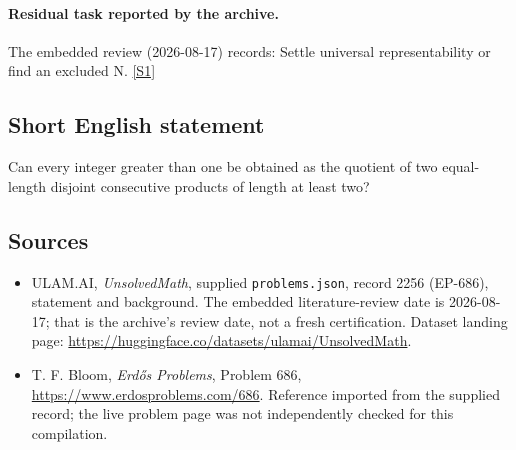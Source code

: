 \documentclass[11pt,a4paper]{article}
\newcommand{\sref}[2]{\hyperlink{source:#1:#2}{[S#2]}}
\begin{document}
\paragraph{Residual task reported by the archive.}

The embedded review (2026-08-17) records: Settle universal representability or find an excluded N. \sref{2256}{1}

\subsection{Short English statement}

Can every integer greater than one be obtained as the quotient of two equal-length disjoint consecutive products of length at least two?

\subsection{Sources}

{\small

\begin{itemize}

\item[\hypertarget{source:2256:1}{S1}] ULAM.AI, \emph{UnsolvedMath}, supplied \texttt{problems.json}, record 2256 (EP-686), statement and background. The embedded literature-review date is 2026-08-17; that is the archive’s review date, not a fresh certification. Dataset landing page: \url{https://huggingface.co/datasets/ulamai/UnsolvedMath}.

\item[\hypertarget{source:2256:2}{S2}] T. F. Bloom, \emph{Erdős Problems}, Problem 686, \url{https://www.erdosproblems.com/686}. Reference imported from the supplied record; the live problem page was not independently checked for this compilation.

\end{itemize}

}

\label{end:2256}
\end{document}
